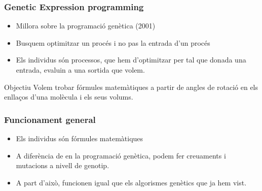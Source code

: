 \documentclass{beamer}
\begin{document}

\begin{frame}
	\frametitle{Genetic Expression programming}
	\begin{center}
	\end{center}
	\begin{itemize}
		\item Millora sobre la programació genètica (2001)
		\item Busquem optimitzar un procés i no pas la entrada d'un procés
		\item Els individus són processos, que hem d'optimitzar per tal que donada una entrada,
			evaluin a una sortida que volem.
	\end{itemize}
	\pause
	\begin{block}{Objectiu}
		Volem trobar fórmules matemàtiques a partir de angles de rotació en els
		enllaços d'una molècula i els seus volums.
	\end{block}
\end{frame}

\begin{frame}
	\frametitle{Funcionament general}
	\begin{itemize}
		\item Els individus són fórmules matemàtiques
		\item A diferència de en la programació genètica, podem fer creuaments i
		mutacions a nivell de genotip.
		\item A part d'això, funcionen igual que els algorismes genètics que ja
		hem vist.
	\end{itemize}
\end{frame}
\end{document}
